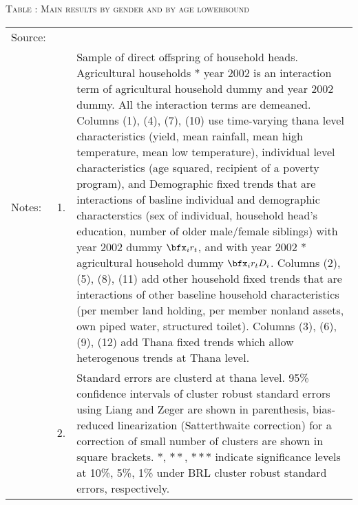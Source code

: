 \begin{table}
\hfil\textsc{\footnotesize Table \thetable: Main results by gender and by age lowerbound\label{MainGenderAgeLBResults}}\\
\setlength{\tabcolsep}{1pt}
\renewcommand{\arraystretch}{.55}
\hspace{-1.25cm}

\renewcommand{\arraystretch}{1}
\hfil\begin{tabular}{>{\hfill\scriptsize}p{1cm}<{}>{\hfill\scriptsize}p{.5cm}<{}>{\scriptsize}p{12cm}<{\hfill}}
Source:& \multicolumn{2}{l}{\scriptsize Compiled from IFPRI data. }\\[-1ex]
Notes:& 1. & Sample of direct offspring of household heads. \textsf{Agricultural households * year 2002} is an interaction term of agricultural household dummy and year 2002 dummy. All the interaction terms are demeaned. Columns \textsf{(1), (4), (7), (10)} use time-varying thana level characteristics (yield, mean rainfall, mean high temperature, mean low temperature), individual level characteristics (age squared, recipient of a poverty program), and \textsf{Demographic fixed trends} that are interactions of basline individual and demographic characterstics (sex of individual, household head's education, number of older male/female siblings) with year 2002 dummy $\bfx_{i}r_{t}$, and with year 2002 * agricultural household dummy $\bfx_{i}r_{t}D_{i}$. Columns \textsf{(2), (5), (8), (11)} add \textsf{other household fixed trends} that are interactions of other baseline household characteristics (per member land holding, per member nonland assets, own piped water, structured toilet). Columns \textsf{(3), (6), (9), (12)} add \textsf{Thana fixed trends} which allow heterogenous trends at Thana level. \\[-1ex]
& 2. & Standard errors are clusterd at thana level. 95\% confidence intervals of cluster robust standard errors using Liang and Zeger are shown in parenthesis, bias-reduced linearization (Satterthwaite correction) for a correction of small number of clusters are shown in square brackets. $*$, $**$, $***$ indicate significance levels at 10\%, 5\%, 1\% under BRL cluster robust standard errors, respectively.\end{tabular}
\end{table}

